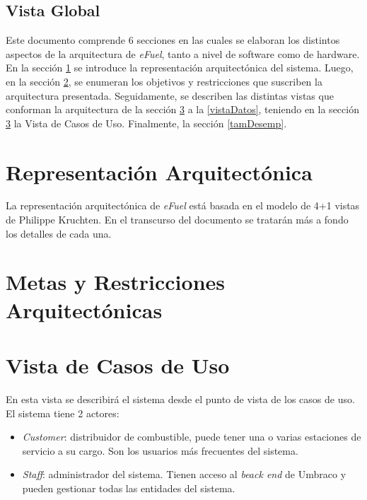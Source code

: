 \documentclass{article}
\begin{document}
    \subsection{Vista Global}
    Este documento comprende 6 secciones en las cuales se elaboran los distintos aspectos de la arquitectura de \emph{eFuel}, tanto a nivel de software como de hardware. En la sección \ref{reprArq} se introduce la representación arquitectónica del sistema. Luego, en la sección \ref{metasArq}, se enumeran los objetivos y restricciones que suscriben la arquitectura presentada. Seguidamente, se describen las distintas vistas que conforman la arquitectura de la sección \ref{vistaCasosDeUso} a la \ref{vistaDatos}, teniendo en la sección \ref{vistaCasosDeUso} la Vista de Casos de Uso. Finalmente, la sección \ref{tamDesemp}.


    \section{Representación Arquitectónica} \label{reprArq}
    La representación arquitectónica de \emph{eFuel} está basada en el modelo de 4+1 vistas de Philippe Kruchten. En el transcurso del documento se tratarán más a fondo los detalles de cada una.

    \section{Metas y Restricciones Arquitectónicas} \label{metasArq}


    \section{Vista de Casos de Uso} \label{vistaCasosDeUso}
    En esta vista se describirá el sistema desde el punto de vista de los casos de uso. El sistema tiene 2 actores:

    \begin{itemize}
        \item \emph{Customer}: distribuidor de combustible, puede tener una o varias estaciones de servicio a su cargo. Son los usuarios más frecuentes del sistema.
        \item \emph{Staff}: administrador del sistema. Tienen acceso al \emph{beack end} de Umbraco y pueden gestionar todas las entidades del sistema.
    \end{itemize}
\end{document}
